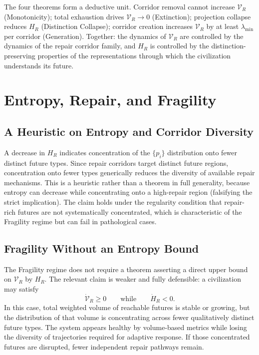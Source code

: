 \documentclass[12pt, a4paper]{article}
\theoremstyle{plain}
\theoremstyle{definition}
\theoremstyle{remark}
\begin{document}
The four theorems form a deductive unit. Corridor removal cannot increase $\mathcal{V}_R$ (Monotonicity); total exhaustion drives $\mathcal{V}_R \to 0$ (Extinction); projection collapse reduces $H_R$ (Distinction Collapse); corridor creation increases $\mathcal{V}_R$ by at least $\lambda_{\min}$ per corridor (Generation). Together: the dynamics of $\mathcal{V}_R$ are controlled by the dynamics of the repair corridor family, and $H_R$ is controlled by the distinction-preserving properties of the representations through which the civilization understands its future.

\section{Entropy, Repair, and Fragility}

\subsection{A Heuristic on Entropy and Corridor Diversity}

A decrease in $H_R$ indicates concentration of the $\{p_i\}$ distribution onto fewer distinct future types. Since repair corridors target distinct future regions, concentration onto fewer types generically reduces the diversity of available repair mechanisms. This is a heuristic rather than a theorem in full generality, because entropy can decrease while concentrating onto a high-repair region (falsifying the strict implication). The claim holds under the regularity condition that repair-rich futures are not systematically concentrated, which is characteristic of the Fragility regime but can fail in pathological cases.

\subsection{Fragility Without an Entropy Bound}

The Fragility regime does not require a theorem asserting a direct upper bound on $\mathcal{V}_R$ by $H_R$. The relevant claim is weaker and fully defensible: a civilization may satisfy
\[
\dot{\mathcal{V}}_R \geq 0 \qquad\text{while}\qquad \dot{H}_R < 0.
\]
In this case, total weighted volume of reachable futures is stable or growing, but the distribution of that volume is concentrating across fewer qualitatively distinct future types. The system appears healthy by volume-based metrics while losing the diversity of trajectories required for adaptive response. If those concentrated futures are disrupted, fewer independent repair pathways remain.
\end{document}
